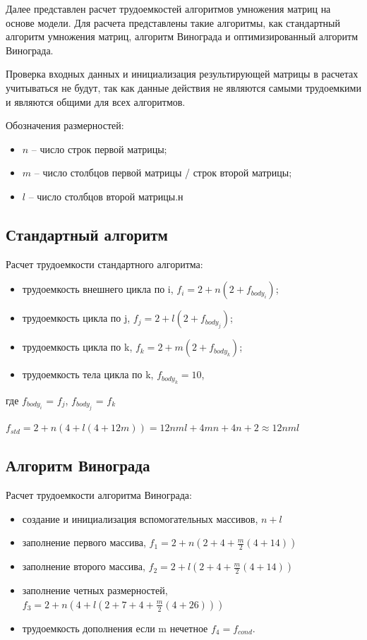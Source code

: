 Далее представлен расчет трудоемкостей алгоритмов умножения матриц на основе модели.
Для расчета представлены такие алгоритмы, как стандартный алгоритм умножения матриц, алгоритм Винограда и оптимизированный алгоритм Винограда.

Проверка входных данных и инициализация результирующей матрицы в расчетах учитываться не будут, так как данные действия не являются самыми трудоемкими и являются общими для всех алгоритмов.

Обозначения размерностей:

\begin{itemize}
    \item $n$ -- число строк первой матрицы;
    \item $m$ -- число столбцов первой матрицы / строк второй матрицы;
    \item $l$ -- число столбцов второй матрицы.н
\end{itemize}

\subsection{Стандартный алгоритм}

Расчет трудоемкости стандартного алгоритма:

\begin{itemize}
    \item трудоемкость внешнего цикла по i, $f_{i} = 2 + n(2 + f_{body_{i}})$;
    \item трудоемкость цикла по j, $f_{j} = 2 + l(2 + f_{body_{j}})$;
    \item трудоемкость цикла по k, $f_{k} = 2 + m(2 + f_{body_{k}})$;
    \item трудоемкость тела цикла по k, $ f_{body_{k}} = 10$,
\end{itemize}

где $f_{body_{i}}$ = $f_{j}$, $f_{body_{j}}$ = $f_{k}$

$f_{std} = 2 + n(4 + l(4 + 12m)) = 12nml + 4mn + 4n + 2 \approx 12nml$

\subsection{Алгоритм Винограда}

Расчет трудоемкости алгоритма Винограда:

\begin{itemize}
    \item создание и инициализация вспомогательных массивов, $n + l$
    \item заполнение первого массива, $f_{1} = 2 + n(2 + 4 + \frac{m}{2}(4 + 14))$
    \item заполнение второго массива, $f_{2} = 2 + l(2 + 4 + \frac{m}{2}(4 + 14))$
    \item заполнение четных размерностей, $f_{3} = 2 + n(4 + l(2 + 7 + 4 + \frac{m}{2}(4 + 26)))$
    \item трудоемкость дополнения если m нечетное $f_{4} = f_{cond}$.
\end{itemize}

